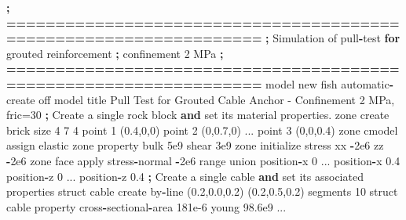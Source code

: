 \documentclass[a4paper, nobind]{templates/ociamthesis}
\newenvironment{Shaded}{\begin{snugshade}}{\end{snugshade}}
\newcommand{\BuiltInTok}[1]{#1}
\newcommand{\ControlFlowTok}[1]{\textcolor[rgb]{0.13,0.29,0.53}{\textbf{#1}}}
\newcommand{\DecValTok}[1]{\textcolor[rgb]{0.00,0.00,0.81}{#1}}
\newcommand{\FloatTok}[1]{\textcolor[rgb]{0.00,0.00,0.81}{#1}}
\newcommand{\KeywordTok}[1]{\textcolor[rgb]{0.13,0.29,0.53}{\textbf{#1}}}
\newcommand{\NormalTok}[1]{#1}
\newcommand{\OperatorTok}[1]{\textcolor[rgb]{0.81,0.36,0.00}{\textbf{#1}}}
\newcommand{\StringTok}[1]{\textcolor[rgb]{0.31,0.60,0.02}{#1}}
\renewenvironment{Shaded}
{
  \vspace{10pt}%
  \begin{snugshade}%
}{%
  \end{snugshade}%
  \vspace{8pt}%
}
\begin{document}
\begin{Shaded}
\begin{Highlighting}[]
    \OperatorTok{;} \OperatorTok{==================================================================}
    \OperatorTok{;}\NormalTok{   Simulation of pull}\OperatorTok{{-}}\NormalTok{test }\ControlFlowTok{for}\NormalTok{ grouted reinforcement}
    \OperatorTok{;}\NormalTok{     confinement }\DecValTok{2}\NormalTok{ MPa}
    \OperatorTok{;} \OperatorTok{==================================================================}
\NormalTok{    model new}
\NormalTok{    fish automatic}\OperatorTok{{-}}\NormalTok{create off}
\NormalTok{    model title }\StringTok{\textquotesingle{}Pull Test for Grouted Cable Anchor {-} Confinement 2 MPa, fric=30\textquotesingle{}}
    \OperatorTok{;}\NormalTok{ Create a single rock block }\KeywordTok{and} \BuiltInTok{set}\NormalTok{ its material properties.}
\NormalTok{    zone create brick size }\DecValTok{4} \DecValTok{7} \DecValTok{4}\NormalTok{ point }\DecValTok{1}\NormalTok{ (}\FloatTok{0.4}\NormalTok{,}\DecValTok{0}\NormalTok{,}\DecValTok{0}\NormalTok{) point }\DecValTok{2}\NormalTok{ (}\DecValTok{0}\NormalTok{,}\FloatTok{0.7}\NormalTok{,}\DecValTok{0}\NormalTok{) ...}
\NormalTok{                                 point }\DecValTok{3}\NormalTok{ (}\DecValTok{0}\NormalTok{,}\DecValTok{0}\NormalTok{,}\FloatTok{0.4}\NormalTok{)}
\NormalTok{    zone cmodel assign elastic}
\NormalTok{    zone }\BuiltInTok{property}\NormalTok{ bulk }\FloatTok{5e9}\NormalTok{ shear }\FloatTok{3e9}
\NormalTok{    zone initialize stress xx }\OperatorTok{{-}}\FloatTok{2e6}\NormalTok{ zz }\OperatorTok{{-}}\FloatTok{2e6}
\NormalTok{    zone face }\BuiltInTok{apply}\NormalTok{ stress}\OperatorTok{{-}}\NormalTok{normal }\OperatorTok{{-}}\FloatTok{2e6} \BuiltInTok{range}\NormalTok{ union position}\OperatorTok{{-}}\NormalTok{x }\DecValTok{0}\NormalTok{ ...}
\NormalTok{                                             position}\OperatorTok{{-}}\NormalTok{x }\FloatTok{0.4}\NormalTok{ position}\OperatorTok{{-}}\NormalTok{z }\DecValTok{0}\NormalTok{ ...}
\NormalTok{                                             position}\OperatorTok{{-}}\NormalTok{z }\FloatTok{0.4}
    \OperatorTok{;}\NormalTok{ Create a single cable }\KeywordTok{and} \BuiltInTok{set}\NormalTok{ its associated properties}
\NormalTok{    struct cable create by}\OperatorTok{{-}}\NormalTok{line (}\FloatTok{0.2}\NormalTok{,}\FloatTok{0.0}\NormalTok{,}\FloatTok{0.2}\NormalTok{) (}\FloatTok{0.2}\NormalTok{,}\FloatTok{0.5}\NormalTok{,}\FloatTok{0.2}\NormalTok{) segments }\DecValTok{10}
\NormalTok{    struct cable }\BuiltInTok{property}\NormalTok{ cross}\OperatorTok{{-}}\NormalTok{sectional}\OperatorTok{{-}}\NormalTok{area }\FloatTok{181e{-}6}\NormalTok{ young }\FloatTok{98.6e9}\NormalTok{ ...}

\end{Highlighting}
\end{Shaded}
\end{document}
